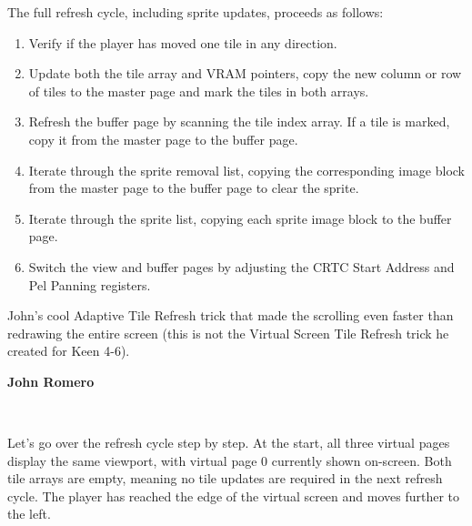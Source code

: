\documentclass[book.tex]{subfiles}
\begin{document}
\par
The full refresh cycle, including sprite updates, proceeds as follows:
\begin{enumerate}
  \item Verify if the player has moved one tile in any direction.
  \item Update both the tile array and VRAM pointers, copy the new column or row of tiles to the master page and mark the tiles in both arrays.
  \item Refresh the buffer page by scanning the tile index array. If a tile is marked, copy it from the master page to the buffer page.
  \item Iterate through the sprite removal list, copying the corresponding image block from the master page to the buffer page to clear the sprite.
  \item Iterate through the sprite list, copying each sprite image block to the buffer page.
  \item Switch the view and buffer pages by adjusting the CRTC Start Address and Pel Panning registers.
\end{enumerate}


\vspace{0.5cm}
\par
\begin{minipage}{\textwidth}
  
\end{minipage}
\label{state_type}

\begin{fancyquotes}
John's cool Adaptive Tile Refresh trick that made the scrolling even faster than redrawing the entire screen (this is not the Virtual Screen Tile Refresh trick he created for Keen 4-6).\\
\par
\textbf{John Romero\protect\footnotemark}
\end{fancyquotes}\\
\addtocounter{footnote}{-1}

\pagebreak
Let's go over the refresh cycle step by step. At the start, all three virtual pages display the same viewport, with virtual page 0 currently shown on-screen. Both tile arrays are empty, meaning no tile updates are required in the next refresh cycle. The player has reached the edge of the virtual screen and moves further to the left. \\
\end{document}
